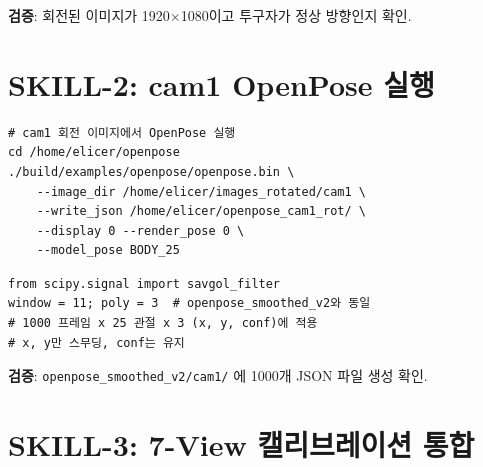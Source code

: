 \documentclass[11pt, a4paper]{report}
\begin{document}
\textbf{검증}: 회전된 이미지가 1920$\times$1080이고 투구자가 정상 방향인지 확인.


\section{SKILL-2: cam1 OpenPose 실행}

\begin{codebox}[title={서버 명령어}]
\begin{verbatim}
# cam1 회전 이미지에서 OpenPose 실행
cd /home/elicer/openpose
./build/examples/openpose/openpose.bin \
    --image_dir /home/elicer/images_rotated/cam1 \
    --write_json /home/elicer/openpose_cam1_rot/ \
    --display 0 --render_pose 0 \
    --model_pose BODY_25
\end{verbatim}
\end{codebox}

\begin{codebox}[title={스무딩 (기존과 동일 파라미터)}]
\begin{verbatim}
from scipy.signal import savgol_filter
window = 11; poly = 3  # openpose_smoothed_v2와 동일
# 1000 프레임 x 25 관절 x 3 (x, y, conf)에 적용
# x, y만 스무딩, conf는 유지
\end{verbatim}
\end{codebox}

\textbf{검증}: \texttt{openpose\_smoothed\_v2/cam1/} 에 1000개 JSON 파일 생성 확인.


\section{SKILL-3: 7-View 캘리브레이션 통합}
\end{document}
